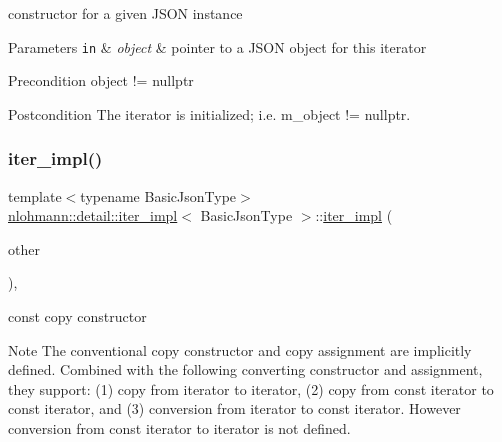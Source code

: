 constructor for a given J\+S\+ON instance 


\begin{DoxyParams}[1]{Parameters}
\mbox{\tt in}  & {\em object} & pointer to a J\+S\+ON object for this iterator \\
\hline
\end{DoxyParams}
\begin{DoxyPrecond}{Precondition}
object != nullptr 
\end{DoxyPrecond}
\begin{DoxyPostcond}{Postcondition}
The iterator is initialized; i.\+e. {\ttfamily m\+\_\+object != nullptr}. 
\end{DoxyPostcond}
\mbox{\label{classnlohmann_1_1detail_1_1iter__impl_a71f84fb6e009619f12972bcf9002b8cd}} 
\subsubsection{\texorpdfstring{iter\+\_\+impl()}{iter\_impl()}\hspace{0.1cm}{\footnotesize\ttfamily [3/4]}}
{\footnotesize\ttfamily template$<$typename Basic\+Json\+Type$>$ \\
\mbox{\hyperlink{classnlohmann_1_1detail_1_1iter__impl}{nlohmann\+::detail\+::iter\+\_\+impl}}$<$ Basic\+Json\+Type $>$\+::\mbox{\hyperlink{classnlohmann_1_1detail_1_1iter__impl}{iter\+\_\+impl}} (\begin{DoxyParamCaption}\item[{const \mbox{\hyperlink{classnlohmann_1_1detail_1_1iter__impl}{iter\+\_\+impl}}$<$ const Basic\+Json\+Type $>$ \&}]{other }\end{DoxyParamCaption})\hspace{0.3cm}{\ttfamily [inline]}, {\ttfamily [noexcept]}}



const copy constructor 

\begin{DoxyNote}{Note}
The conventional copy constructor and copy assignment are implicitly defined. Combined with the following converting constructor and assignment, they support\+: (1) copy from iterator to iterator, (2) copy from const iterator to const iterator, and (3) conversion from iterator to const iterator. However conversion from const iterator to iterator is not defined.
\end{DoxyNote}
~\newline

